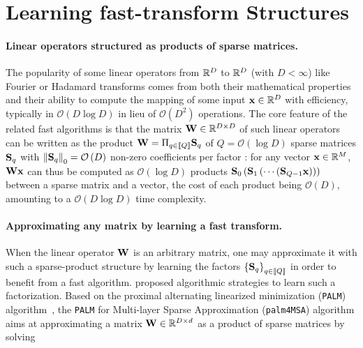 \documentclass[12pt]{article}
\def\palm{\texttt{palm4MSA}\xspace}
\newcommand{\bigO}[1]{\mathcal{O}\left(#1\right)}
\def\nfactors{Q}
\begin{document}
\section{Learning fast-transform Structures}
\label{sec:palm}
\paragraph{Linear operators structured as products of sparse matrices.}
The popularity of some linear operators from $\mathbb{R}^{D}$ to $\mathbb{R}^{D}$ (with $D<\infty$)
 like Fourier or Hadamard transforms comes from both their mathematical 
 properties and their ability to compute the mapping of some input ${\mathbf{x}}\in\mathbb{R}^D$ with efficiency, typically in $\mathcal{O}\left (D\log D\right )$ in lieu of  
  $\mathcal{O}\left (D^2\right)$ operations.
The core feature of the related fast algorithms is that the matrix ${\mathbf{W}}\in{\mathbb{R}}^{D\times D}$ of such 
linear operators can be written as the product $\rmW=\Pi_{q\in\intint{\nfactors}}\rmS_q$ 
of $\nfactors=\bigO{\log D}$ sparse 
matrices ${\mathbf{S}}_q$ with $\left \|{\mathbf{S}}_q\right \|_0=\mathcal{O}\left( D \right)$ non-zero 
coefficients per factor \cite{LeMagoarou2016Flexible,Morgenstern1975Linear}:
for any vector ${\mathbf{x}}\in{\mathbb{R}}^M$, ${\mathbf{W}}{\mathbf{x}}$ can thus be computed as $\mathcal{O}\left (\log D\right )$ products ${\mathbf{S}}_0 \left ({\mathbf{S}}_1 \left (\cdots \left ({\mathbf{S}}_{Q-1}{\mathbf{x}}\right )\right )\right )$ between a sparse matrix and a vector, the cost of each product being $\bigO{D}$, amounting to a $\mathcal{O}(D \log D)$ time complexity.

\paragraph{Approximating any matrix by learning a fast transform.} When the linear operator ${\mathbf{W}}$ is an arbitrary matrix, one may approximate it with such a sparse-product structure by learning the factors $\left \lbrace{\mathbf{S}}_q\right \rbrace_{q\in\left \llbracket Q\right \rrbracket}$ in order to benefit from a fast algorithm.
\cite{LeMagoarou2016Flexible} proposed algorithmic strategies to learn such a factorization. Based on the proximal alternating linearized minimization (\texttt{PALM}) algorithm~\cite{bolte2014proximal}, the \texttt{PALM} for Multi-layer Sparse Approximation (\palm) algorithm aims at approximating a matrix ${\mathbf{W}}\in{\mathbb{R}}^{D \times d}$ as a product of sparse matrices by solving
\end{document}
